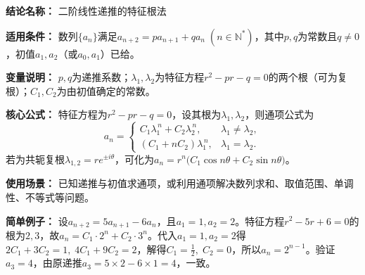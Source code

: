 \textbf{结论名称：} 二阶线性递推的特征根法

\textbf{适用条件：} 数列$\{a_n\}$满足$a_{n+2}=pa_{n+1}+qa_n\;(n\in\mathbb{N}^*)$，其中$p,q$为常数且$q\neq0$，初值$a_1,a_2$（或$a_0,a_1$）已给。

\textbf{变量说明：} $p,q$为递推系数；$\lambda_1,\lambda_2$为特征方程$r^2-pr-q=0$的两个根（可为复根）；$C_1,C_2$为由初值确定的常数。

\textbf{核心公式：} 特征方程为$r^2-pr-q=0$，设其根为$\lambda_1,\lambda_2$，则通项公式为
\[
\boxed{
a_n=
\begin{cases}
C_1\lambda_1^{\,n}+C_2\lambda_2^{\,n}, & \lambda_1\neq\lambda_2,\\[4pt]
(C_1+nC_2)\lambda_1^{\,n}, & \lambda_1=\lambda_2 .
\end{cases}}
\]
若为共轭复根$\lambda_{1,2}=re^{\pm i\theta}$，可化为$a_n=r^n\bigl(C_1\cos n\theta + C_2\sin n\theta\bigr)$。

\textbf{使用场景：} 已知递推与初值求通项，或利用通项解决数列求和、取值范围、单调性、不等式等问题。

\textbf{简单例子：} 设$a_{n+2}=5a_{n+1}-6a_n$，且$a_1=1,a_2=2$。特征方程$r^2-5r+6=0$的根为$2,3$，故$a_n=C_1\cdot2^n+C_2\cdot3^n$。代入$a_1=1,a_2=2$得$2C_1+3C_2=1,\;4C_1+9C_2=2$，解得$C_1=\frac12,\;C_2=0$，所以$a_n=2^{n-1}$。验证$a_3=4$，由原递推$a_3=5\times2-6\times1=4$，一致。